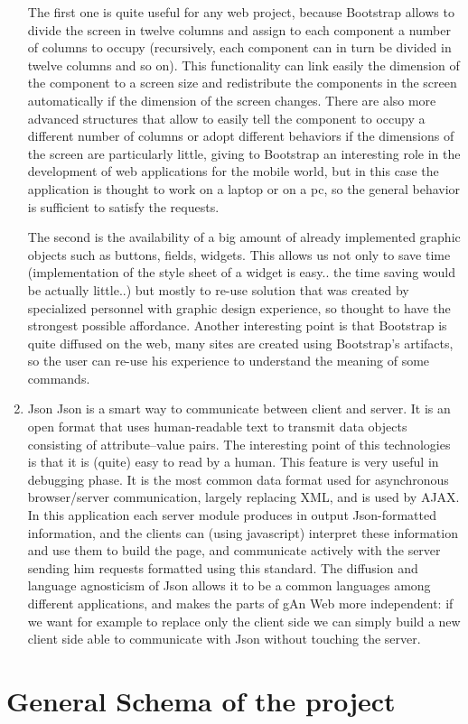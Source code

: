\begin{enumerate}
The first one is quite useful for any web project, because Bootstrap allows to divide the screen in twelve columns and assign to each component a number of columns to occupy (recursively, each component can in turn be divided in twelve columns and so on). This functionality can link easily the dimension of the component to a screen size and redistribute the components in the screen automatically if the dimension of the screen changes. There are also more advanced structures that allow to easily tell the component to occupy a different number of columns or adopt different behaviors if the dimensions of the screen are particularly little, giving to Bootstrap an interesting role in the development of web applications for the mobile world, but in this case the application is thought to work on a laptop or on a pc, so the general behavior is sufficient to satisfy the requests.



The second is the availability of a big amount of already implemented graphic objects such as buttons, fields, widgets. This allows us not only to save time (implementation of the style sheet of a widget is easy.. the time saving would be actually little..) but mostly to re-use solution that was created by specialized personnel with graphic design experience, so thought to have the strongest possible affordance. Another interesting point is that Bootstrap is quite diffused on the web, many sites are created using Bootstrap's artifacts, so the user can re-use his experience to understand the meaning of some commands. 
  
\item
Json
Json is a smart way to communicate between client and server.
It is an open format that uses human-readable text to transmit data objects consisting of attribute–value pairs. The interesting point of this technologies is that it is (quite) easy to read by a human. This feature is very useful in debugging phase.  
It is the most common data format used for asynchronous browser/server communication, largely replacing XML, and is used by AJAX. In this application each server module produces in output Json-formatted information, and the clients can (using javascript) interpret these information and use them to build the page, and communicate actively with the server sending him requests formatted using this standard.
The diffusion and language agnosticism of Json allows it to be a common languages among different applications, and makes the parts of gAn Web more independent: if we want for example to replace only the client side we can simply build a new client side able to communicate with Json without touching the server. 

\end{enumerate}  


\section{General Schema of the project}

